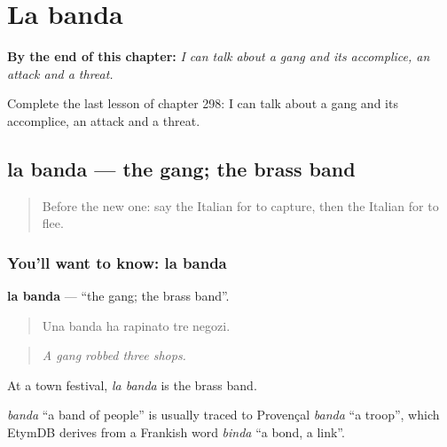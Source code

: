 
\chapter{La banda}
\label{ch:it-la-banda}

\begin{chapteropening}
\textbf{By the end of this chapter:} \emph{I can talk about a gang and its accomplice, an attack and a threat.}

Complete the last lesson of chapter 298: I can talk about a gang and its accomplice, an attack and a threat.
\end{chapteropening}

\section[la banda]{la banda — the gang; the brass band}

\label{lesson:IT-C298-banda}



\begin{quote}
Before the new one: say the Italian for to capture, then the Italian for to flee.
\end{quote}

\subsection*{You'll want to know: la banda}
\textbf{la banda} — \textquotedblleft{}the gang; the brass band\textquotedblright{}.

\begin{quote}
Una banda ha rapinato tre negozi.
\end{quote}

\begin{quote}
\emph{A gang robbed three shops.}
\end{quote}

At a town festival, \emph{la banda} is the brass band.

\begin{cousinweb}
\emph{banda} \textquotedblleft{}a band of people\textquotedblright{} is usually traced to Provençal \emph{banda} \textquotedblleft{}a troop\textquotedblright{}, which EtymDB derives from a Frankish word \emph{binda} \textquotedblleft{}a bond, a link\textquotedblright{}.
\end{cousinweb}

